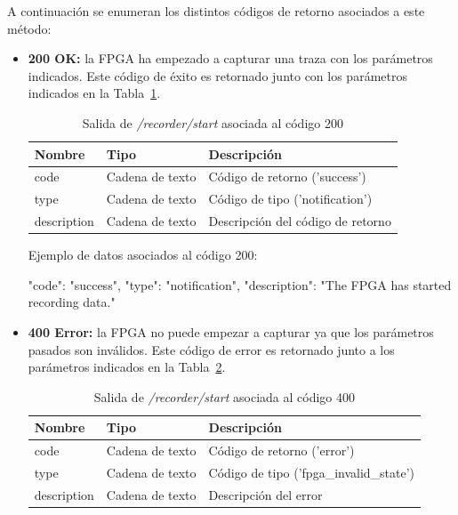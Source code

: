 A continuación se enumeran los distintos códigos de retorno asociados a este método:
\begin{itemize}

\item{\textbf{200 OK:} la \gls{FPGA} ha empezado a capturar una traza con los parámetros indicados.
Este código de éxito es retornado junto con los parámetros indicados en la Tabla~\ref{extra:api:recorderstart:ok}.
\begin{table}[H]
\centering
\begin{tabular}{|l|l|l|}
\hline
\rowcolor[HTML]{F5F5F5}
\textbf{Nombre}  & \textbf{Tipo}   & \textbf{Descripción}              \\ \hline
code             & Cadena de texto & Código de retorno ('success')     \\ \hline
type             & Cadena de texto & Código de tipo ('notification')   \\ \hline
description      & Cadena de texto & Descripción del código de retorno \\ \hline
\end{tabular}
\caption{Salida de \textit{/recorder/start} asociada al código 200}
\label{extra:api:recorderstart:ok}
\end{table}
\begin{minipage}{\textwidth}
Ejemplo de datos asociados al código 200:

\begin{code}[language=json]
{
  "code": "success",
  "type": "notification",
  "description": "The FPGA has started recording data."
}
\end{code}
\end{minipage}
}

\item{\textbf{400 Error:} la \gls{FPGA} no puede empezar a capturar ya que los parámetros pasados son inválidos.
Este código de error es retornado junto a los parámetros indicados en la Tabla~\ref{extra:api:recorderstart:error400}.
\begin{table}[H]
\centering
\begin{tabular}{|l|l|l|}
\hline
\rowcolor[HTML]{F5F5F5}
\textbf{Nombre}  & \textbf{Tipo}   & \textbf{Descripción}                    \\ \hline
code             & Cadena de texto & Código de retorno ('error')             \\ \hline
type             & Cadena de texto & Código de tipo ('fpga\_invalid\_state') \\ \hline
description      & Cadena de texto & Descripción del error                   \\ \hline
\end{tabular}
\caption{Salida de \textit{/recorder/start} asociada al código 400}
\label{extra:api:recorderstart:error400}
\end{table}

}
\end{itemize}
